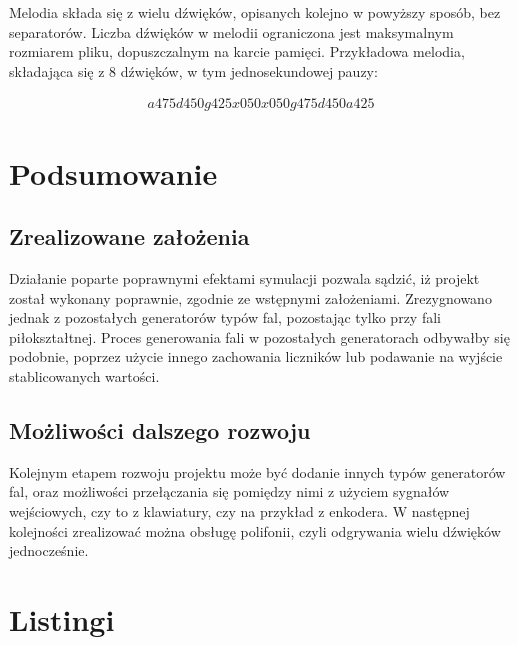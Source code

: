\documentclass[a4paper,12pt]{article}
\begin{document}
Melodia składa się z wielu dźwięków, opisanych kolejno w powyższy sposób, bez separatorów. Liczba dźwięków w melodii ograniczona jest maksymalnym rozmiarem pliku, dopuszczalnym na karcie pamięci. 
Przykładowa melodia, składająca się z 8 dźwięków, w tym jednosekundowej pauzy:

\begin{align*}
  a475d450g425x050x050g475d450a425
\end{align*}

\clearpage
\section{Podsumowanie}

\subsection{Zrealizowane założenia}
Działanie poparte poprawnymi efektami symulacji pozwala sądzić, iż projekt został wykonany poprawnie, zgodnie ze wstępnymi założeniami. Zrezygnowano jednak z pozostałych generatorów typów fal, pozostając tylko przy fali piłokształtnej. Proces generowania fali w pozostałych generatorach odbywałby się podobnie, poprzez użycie innego zachowania liczników lub podawanie na wyjście stablicowanych wartości.

\subsection{Możliwości dalszego rozwoju}
Kolejnym etapem rozwoju projektu może być dodanie innych typów generatorów fal, oraz możliwości przełączania się pomiędzy nimi z użyciem sygnałów wejściowych, czy to z klawiatury, czy na przykład z enkodera. W następnej kolejności zrealizować można obsługę polifonii, czyli odgrywania wielu dźwięków jednocześnie.

\clearpage 
\section{Listingi}









\clearpage 

\nocite{*}
\newpage

\printbibliography
\end{document}
